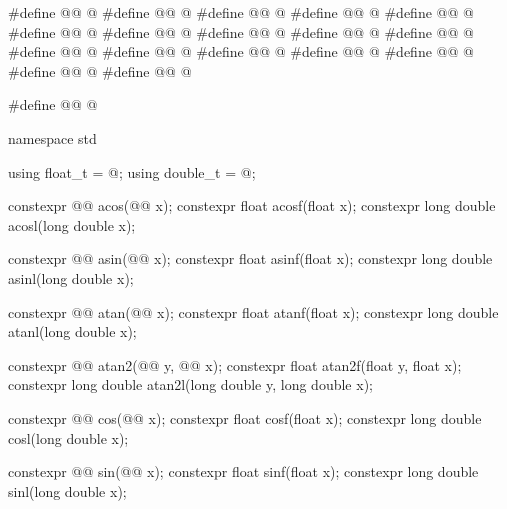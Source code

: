 %
%
%
%
%
\begin{codeblock}
#define @@ @\seebelow@
#define @@ @\seebelow@
#define @@ @\seebelow@
#define @@ @\seebelow@
#define @@ @\seebelow@
#define @@ @\seebelow@
#define @@ @\seebelow@
#define @@ @\seebelow@
#define @@ @\seebelow@
#define @@ @\seebelow@
#define @@ @\seebelow@
#define @@ @\seebelow@
#define @@ @\seebelow@
#define @@ @\seebelow@
#define @@ @\seebelow@
#define @@ @\seebelow@
#define @@ @\seebelow@

#define @@ @\seebelow@

namespace std {
  using float_t = @\seebelow@;
  using double_t = @\seebelow@;

  constexpr @@ acos(@@ x);
  constexpr float               acosf(float x);
  constexpr long double         acosl(long double x);

  constexpr @@ asin(@@ x);
  constexpr float               asinf(float x);
  constexpr long double         asinl(long double x);

  constexpr @@ atan(@@ x);
  constexpr float               atanf(float x);
  constexpr long double         atanl(long double x);

  constexpr @@ atan2(@@ y, @@ x);
  constexpr float               atan2f(float y, float x);
  constexpr long double         atan2l(long double y, long double x);

  constexpr @@ cos(@@ x);
  constexpr float               cosf(float x);
  constexpr long double         cosl(long double x);

  constexpr @@ sin(@@ x);
  constexpr float               sinf(float x);
  constexpr long double         sinl(long double x);

}
\end{codeblock}
